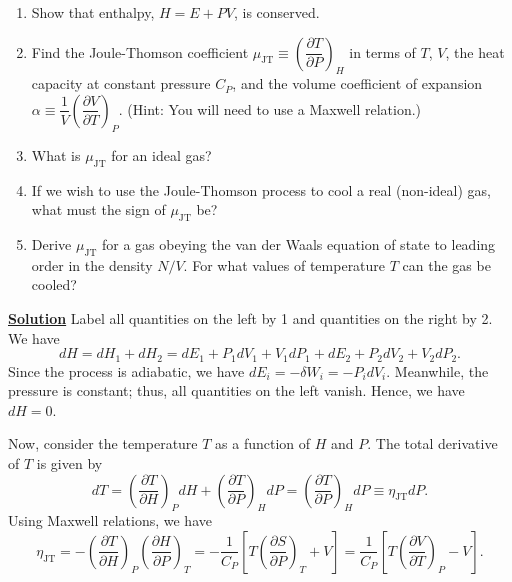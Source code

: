 \begin{enumerate}

  \item Show that enthalpy, $H = E + PV$, is conserved.

  \item Find the Joule-Thomson coefficient
    $\mu_{\mathrm{JT}} \equiv \left(\dfrac{\partial T}{\partial P}\right)_{\!H}$
    in terms of $T$, $V$, the heat capacity at constant pressure $C_P$,
    and the volume coefficient of expansion
    $\alpha \equiv \dfrac{1}{V}\!\left(\dfrac{\partial V}{\partial T}\right)_{\!P}$.
    (Hint: You will need to use a Maxwell relation.)

  \item What is $\mu_{\mathrm{JT}}$ for an ideal gas?

  \item If we wish to use the Joule-Thomson process to cool a real (non-ideal)
    gas, what must the sign of $\mu_{\mathrm{JT}}$ be?

  \item Derive $\mu_{\mathrm{JT}}$ for a gas obeying the van der Waals equation
    of state to leading order in the density $N/V$. For what values of
    temperature $T$ can the gas be cooled?

\end{enumerate}

\noindent \underline{\textbf{Solution}} Label all quantities on the left by 1 and quantities on the right by 2. We have 
\begin{equation}
    dH = dH_1+ dH_2 = dE_1 + P_1dV_1 + V_1dP_1 + dE_2 + P_2dV_2 + V_2dP_2. 
\end{equation}
Since the process is adiabatic, we have $dE_i = -\delta W_i = -P_idV_i$. Meanwhile, the pressure is constant; thus, all quantities on the left vanish. Hence, we have $dH=0$. 

Now, consider the temperature $T$ as a function of $H$ and $P$. The total derivative of $T$ is given by
\begin{equation}
    dT = \left(\frac{\partial T}{\partial H}\right)_P dH + \left(\frac{\partial T}{\partial P}\right)_H dP = \left(\frac{\partial T}{\partial P}\right)_H dP \equiv \eta_{\text{JT}}dP.
\end{equation}
Using Maxwell relations, we have
\begin{equation}
    \eta_{\text{JT}} = -\left(\frac{\partial T}{\partial H}\right)_P\left(\frac{\partial H}{\partial P}\right)_T = -\frac{1}{C_P}\left[T\left(\frac{\partial S}{\partial P}\right)_T + V\right] = \frac{1}{C_P}\left[T\left(\frac{\partial V}{\partial T}\right)_P - V\right].
\end{equation}


